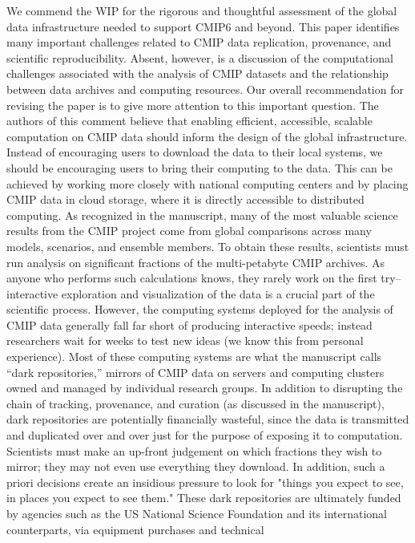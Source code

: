 \documentclass[gmd,manuscript]{copernicus}
\begin{document}
We commend the WIP for the rigorous and thoughtful assessment of the
global data infrastructure needed to support CMIP6 and beyond. This
paper identifies many important challenges related to CMIP data
replication, provenance, and scientific reproducibility. Absent,
however, is a discussion of the computational challenges associated
with the analysis of CMIP datasets and the relationship between data
archives and computing resources. Our overall recommendation for
revising the paper is to give more attention to this important
question. The authors of this comment believe that enabling efficient,
accessible, scalable computation on CMIP data should inform the design
of the global infrastructure. Instead of encouraging users to download
the data to their local systems, we should be encouraging users to
bring their computing to the data. This can be achieved by working
more closely with national computing centers and by placing CMIP data
in cloud storage, where it is directly accessible to distributed
computing. As recognized in the manuscript, many of the most valuable
science results from the CMIP project come from global comparisons
across many models, scenarios, and ensemble members. To obtain these
results, scientists must run analysis on significant fractions of the
multi-petabyte CMIP archives. As anyone who performs such calculations
knows, they rarely work on the first try–interactive exploration and
visualization of the data is a crucial part of the scientific process.
However, the computing systems deployed for the analysis of CMIP data
generally fall far short of producing interactive speeds; instead
researchers wait for weeks to test new ideas (we know this from
personal experience). Most of these computing systems are what the
manuscript calls “dark repositories,” mirrors of CMIP data on servers
and computing clusters owned and managed by individual research
groups. In addition to disrupting the chain of tracking, provenance,
and curation (as discussed in the manuscript), dark repositories are
potentially financially wasteful, since the data is transmitted and
duplicated over and over just for the purpose of exposing it to
computation. Scientists must make an up-front judgement on which
fractions they wish to mirror; they may not even use everything they
download. In addition, such a priori decisions create an insidious
pressure to look for "things you expect to see, in places you expect
to see them." These dark repositories are ultimately funded by
agencies such as the US National Science Foundation and its
international counterparts, via equipment purchases and technical
\end{document}
